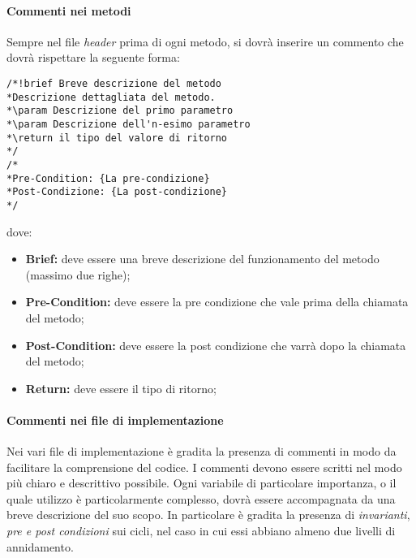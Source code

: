 \paragraph{Commenti nei metodi\\}
\label{commenti}
Sempre nel file \textit{header} prima di ogni metodo, si dovrà inserire un commento che dovrà rispettare la seguente forma:
\begin{verbatim}
/*!brief Breve descrizione del metodo
*Descrizione dettagliata del metodo.
*\param Descrizione del primo parametro
*\param Descrizione dell'n-esimo parametro
*\return il tipo del valore di ritorno
*/
/*
*Pre-Condition: {La pre-condizione}
*Post-Condizione: {La post-condizione}
*/
\end{verbatim}
dove:
\begin{itemize}
\item\textbf{Brief:} deve essere una breve descrizione del funzionamento del metodo (massimo due righe);
\item\textbf{Pre-Condition:} deve essere la pre condizione che vale prima della chiamata del metodo;
\item\textbf{Post-Condition:} deve essere la post condizione che varrà dopo la chiamata del metodo;
\item\textbf{Return:} deve essere il tipo di ritorno;
\end{itemize}

\paragraph{Commenti nei file di implementazione\\}
\label{implementazione}
Nei vari file di implementazione è gradita la presenza di commenti in modo da facilitare la comprensione del codice. I commenti devono essere scritti nel modo più chiaro e descrittivo possibile. Ogni variabile di particolare importanza, o il quale utilizzo è particolarmente complesso, dovrà essere accompagnata da una breve descrizione del suo scopo. In particolare è gradita la presenza di \textit{invarianti}, \textit{pre e post condizioni} sui cicli, nel caso in cui essi abbiano almeno due livelli di annidamento.
